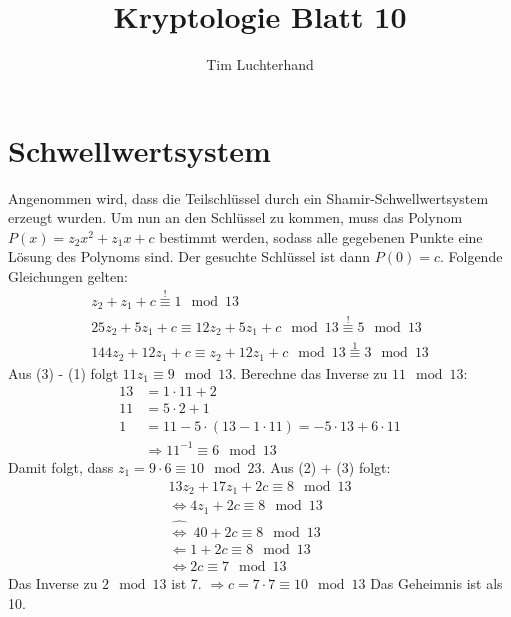 \documentclass[DIN, pagenumber=false, fontsize=11pt, parskip=half]{scrartcl}
\title{Kryptologie Blatt 10}
\author{Tim Luchterhand}
\newcommand{\congTo}[3][]{\stackrel{#1}{\equiv} #2\mod #3}
\begin{document}
    \maketitle
    \section{Schwellwertsystem}
    Angenommen wird, dass die Teilschlüssel durch ein Shamir-Schwellwertsystem erzeugt wurden. Um nun an den Schlüssel zu kommen, muss das
    Polynom $P(x) = z_2 x^2 + z_1 x + c$ bestimmt werden, sodass alle gegebenen Punkte eine Lösung des Polynoms sind. Der gesuchte Schlüssel ist
    dann $P(0) = c$. Folgende Gleichungen gelten:
    \begin{align}
        z_2 + z_1 + c \congTo[!]{1}{13} \\
        25 z_2 + 5 z_1 + c \congTo{12 z_2 + 5 z_1 + c}{13} \congTo[!]{5}{13}\\
        144 z_2 + 12 z_1 + c \congTo{z_2 + 12 z_1 + c}{13} \congTo[1]{3}{13}
    \end{align}
    Aus (3) - (1) folgt $11 z_1 \congTo{9}{13}$. Berechne das Inverse zu $11 \mod 13$:
    \begin{align*}
        13 &= 1 \cdot 11 + 2 \\
        11 &= 5 \cdot2 + 1 \\
        1 &= 11 - 5 \cdot (13 - 1 \cdot 11) = -5 \cdot 13 + 6 \cdot 11 \\
        &\Rightarrow 11^{-1} \congTo{6}{13}
    \end{align*}
    Damit folgt, dass $z_1 = 9 \cdot 6 \congTo{10}{23}$. Aus (2) + (3) folgt:
    \begin{align*}
        13 z_2 + 17 z_1 + 2 c \congTo{8}{13} \\
        \Leftrightarrow 4 z_1 + 2 c \congTo{8}{13} \\ 
        \hat{\Leftrightarrow} \ 40 + 2 c \congTo{8}{13} \\
        \Leftarrow 1 + 2 c \congTo{8}{13} \\
        \Leftrightarrow 2 c \congTo{7}{13}
    \end{align*}
    Das Inverse zu $2 \mod 13$ ist 7. $\Rightarrow c = 7 \cdot 7 \congTo{10}{13}$
    Das Geheimnis ist als 10.
\end{document}
